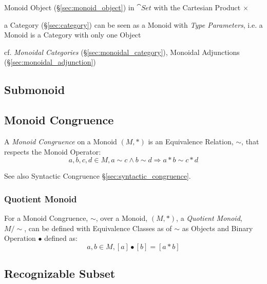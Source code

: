 Monoid Object (\S\ref{sec:monoid_object}) in $\cat{Set}$ with the
Cartesian Product $\times$

a Category (\S\ref{sec:category}) can be seen as a Monoid with \emph{Type
  Parameters}, i.e. a Monoid is a Category with only one Object

\fist cf. \emph{Monoidal Categories} (\S\ref{sec:monoidal_category}),
Monoidal Adjunctions (\S\ref{sec:monoidal_adjunction})



\subsection{Submonoid}\label{sec:submonoid}

\subsection{Monoid Congruence}\label{sec:monoid_congruence}

A \emph{Monoid Congruence} on a Monoid $(M,*)$ is an Equivalence
Relation, $\sim$, that respects the Monoid Operator:
\[
  a,b,c,d \in M, a \sim c \wedge b \sim d \Rightarrow a*b \sim c*d
\]

See also Syntactic Congruence \S\ref{sec:syntactic_congruence}.



\subsubsection{Quotient Monoid}\label{sec:quotient_monoid}

For a Monoid Congruence, $\sim$, over a Monoid, $(M,*)$, a
\emph{Quotient Monoid}, $M/\sim$, can be defined with Equivalence
Classes as of $\sim$ as Objects and Binary Operation $\bullet$ defined
as:
\[
  a,b \in M, [a]\bullet[b] = [a*b]
\]



\subsection{Recognizable Subset}\label{sec:recognizable}

